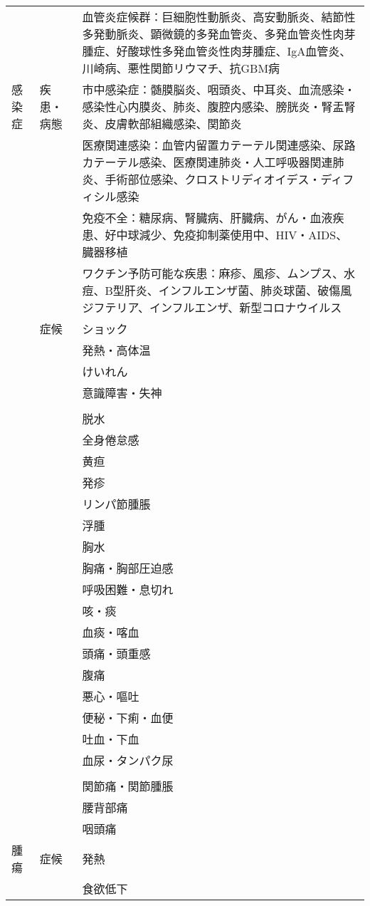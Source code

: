 \begin{xltabular}{\linewidth}{XXX}
 &  & 血管炎症候群：巨細胞性動脈炎、高安動脈炎、結節性多発動脈炎、顕微鏡的多発血管炎、多発血管炎性肉芽腫症、好酸球性多発血管炎性肉芽腫症、IgA血管炎、川崎病、悪性関節リウマチ、抗GBM病 \\
感染症 & 疾患・病態 & 市中感染症：髄膜脳炎、咽頭炎、中耳炎、血流感染・感染性心内膜炎、肺炎、腹腔内感染、膀胱炎・腎盂腎炎、皮膚軟部組織感染、関節炎 \\
 &  & 医療関連感染：血管内留置カテーテル関連感染、尿路カテーテル感染、医療関連肺炎・人工呼吸器関連肺炎、手術部位感染、クロストリディオイデス・ディフィシル感染 \\
 &  & 免疫不全：糖尿病、腎臓病、肝臓病、がん・血液疾患、好中球減少、免疫抑制薬使用中、HIV・AIDS、臓器移植 \\
 &  & ワクチン予防可能な疾患：麻疹、風疹、ムンプス、水痘、B型肝炎、インフルエンザ菌、肺炎球菌、破傷風ジフテリア、インフルエンザ、新型コロナウイルス \\
 & 症候 & ショック \\
 &  & 発熱・高体温 \\
 &  & けいれん \\
 &  & 意識障害・失神 \\
 &  &  \\
 &  & 脱水 \\
 &  & 全身倦怠感 \\
 &  & 黄疸 \\
 &  & 発疹 \\
 &  & リンパ節腫脹 \\
 &  & 浮腫 \\
 &  & 胸水 \\
 &  & 胸痛・胸部圧迫感 \\
 &  & 呼吸困難・息切れ \\
 &  & 咳・痰 \\
 &  & 血痰・喀血 \\
 &  & 頭痛・頭重感 \\
 &  & 腹痛 \\
 &  & 悪心・嘔吐 \\
 &  & 便秘・下痢・血便 \\
 &  & 吐血・下血 \\
 &  & 血尿・タンパク尿 \\
 &  &  \\
 &  & 関節痛・関節腫脹 \\
 &  & 腰背部痛 \\
 &  & 咽頭痛 \\
腫瘍 & 症候 & 発熱 \\
 &  & 食欲低下 \\

\end{xltabular}
